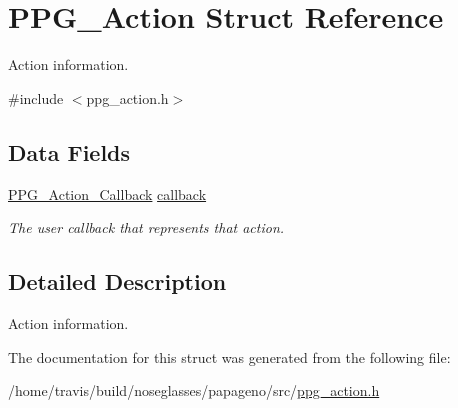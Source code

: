 \hypertarget{structPPG__Action}{\section{P\-P\-G\-\_\-\-Action Struct Reference}
\label{structPPG__Action}
}


Action information.  




{\ttfamily \#include $<$ppg\-\_\-action.\-h$>$}

\subsection*{Data Fields}
\begin{DoxyCompactItemize}
\item 
\hypertarget{structPPG__Action_a0a3c0764ff644c6d0c94d741441001fd}{\hyperlink{structPPG__Action__Callback}{P\-P\-G\-\_\-\-Action\-\_\-\-Callback} \hyperlink{structPPG__Action_a0a3c0764ff644c6d0c94d741441001fd}{callback}}\label{structPPG__Action_a0a3c0764ff644c6d0c94d741441001fd}

\begin{DoxyCompactList}\small\item\em The user callback that represents that action. \end{DoxyCompactList}\end{DoxyCompactItemize}


\subsection{Detailed Description}
Action information. 

The documentation for this struct was generated from the following file\-:\begin{DoxyCompactItemize}
\item 
/home/travis/build/noseglasses/papageno/src/\hyperlink{ppg__action_8h}{ppg\-\_\-action.\-h}\end{DoxyCompactItemize}
